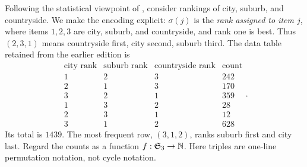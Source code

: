 Following the statistical viewpoint of \cite{diaconis-representations-statistics},
consider rankings of city, suburb, and countryside. We make the encoding
explicit: $\sigma(j)$ is the \emph{rank assigned to item $j$}, where
items $1,2,3$ are city, suburb, and countryside, and rank one is best.
Thus $(2,3,1)$ means countryside first, city second, suburb third.
The data table retained from the earlier edition is
\[
 \begin{array}{ccc|r}
 \text{city rank}&\text{suburb rank}&\text{countryside rank}&\text{count}\\\hline
 1&2&3&242\\2&1&3&170\\3&2&1&359\\1&3&2&28\\2&3&1&12\\3&1&2&628
 \end{array}.
\]
Its total is $1439$. The most frequent row, $(3,1,2)$, ranks suburb first
and city last. Regard the counts as a function $f:\mathfrak S_3\to\mathbb{N}$.
Here triples are one-line permutation notation, not cycle notation.

